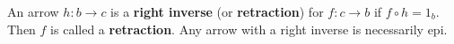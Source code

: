 An arrow $h: b \rightarrow c$ is a \textbf{right inverse} (or \textbf{retraction}) for $f: c \rightarrow b$ if $f \circ h = 1_b$. Then $f$ is called a \textbf{retraction}. Any arrow with a right inverse is necessarily epi.